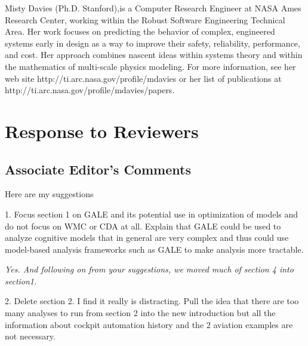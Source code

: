 \documentclass[journal]{IEEEtran}
\begin{document}
\begin{IEEEbiography}{Misty Davies}
(Ph.D. Stanford),is a Computer Research Engineer at
  NASA Ames Research Center, working within the
  Robust Software Engineering Technical Area.  Her
  work focuses on predicting the behavior of
  complex, engineered systems early in design as a
  way to improve their safety, reliability,
  performance, and cost. Her approach combines
  nascent ideas within systems theory and within the
  mathematics of multi-scale physics modeling.
For more information, see her web site http://ti.arc.nasa.gov/profile/mdavies
or her  list of publications at
http://ti.arc.nasa.gov/profile/mdavies/papers.
\end{IEEEbiography}

\clearpage

\section*{Response to Reviewers}

\subsection*{Associate Editor's Comments}

Here are my suggestions

1.      Focus section 1 on GALE and its potential use in optimization of  models and do not focus on WMC or CDA at all. Explain that GALE could be used to analyze cognitive models that in general are very complex and thus could use model-based analysis frameworks such as GALE to make analysis more tractable.

{\em Yes. And following on from your suggestions, we moved much of section 4 into section1.}

2.      Delete section 2. I find it really is distracting. Pull the idea that there are too many analyses to run from section 2 into the new introduction but all the information about cockpit automation history and the 2 aviation examples are not necessary.
\end{document}
